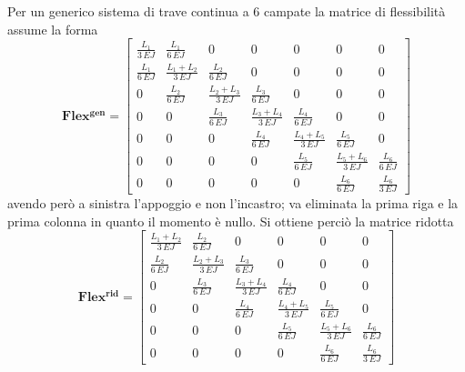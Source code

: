 Per un generico sistema di trave continua a $6$ campate la matrice di flessibilità assume la forma
\begin{equation}
\mathbf{Flex^{gen}}=
\begin{bmatrix}
\frac{L_{1}}{3 \, \mathit{EJ}} & \frac{L_{1}}{6 \, \mathit{EJ}} & 0 & 0 & 0 & 0 & 0 \\
\frac{L_{1}}{6 \, \mathit{EJ}} & \frac{L_{1} + L_{2}}{3 \, \mathit{EJ}} & \frac{L_{2}}{6 \, \mathit{EJ}} & 0 & 0 & 0 & 0 \\
0 & \frac{L_{2}}{6 \, \mathit{EJ}} & \frac{L_{2} + L_{3}}{3 \, \mathit{EJ}} & \frac{L_{3}}{6 \, \mathit{EJ}} & 0 & 0 & 0 \\
0 & 0 & \frac{L_{3}}{6 \, \mathit{EJ}} & \frac{L_{3} + L_{4}}{3 \, \mathit{EJ}} & \frac{L_{4}}{6 \, \mathit{EJ}} & 0 & 0 \\
0 & 0 & 0 & \frac{L_{4}}{6 \, \mathit{EJ}} & \frac{L_{4} + L_{5}}{3 \, \mathit{EJ}} & \frac{L_{5}}{6 \, \mathit{EJ}} & 0 \\
0 & 0 & 0 & 0 & \frac{L_{5}}{6 \, \mathit{EJ}} & \frac{L_{5} + L_{6}}{3 \, \mathit{EJ}} & \frac{L_{6}}{6 \, \mathit{EJ}} \\
0 & 0 & 0 & 0 & 0 & \frac{L_{6}}{6 \, \mathit{EJ}} & \frac{L_{6}}{3 \, \mathit{EJ}}
\end{bmatrix}
\end{equation}
avendo però a sinistra l'appoggio e non l'incastro; va eliminata la prima riga e la prima colonna in quanto il momento è nullo.
Si ottiene perciò la matrice ridotta
\begin{equation}
\mathbf{Flex^{rid}}=
\begin{bmatrix}
\frac{L_{1} + L_{2}}{3 \, \mathit{EJ}} & \frac{L_{2}}{6 \, \mathit{EJ}} & 0 & 0 & 0 & 0 \\
\frac{L_{2}}{6 \, \mathit{EJ}} & \frac{L_{2} + L_{3}}{3 \, \mathit{EJ}} & \frac{L_{3}}{6 \, \mathit{EJ}} & 0 & 0 & 0 \\
0 & \frac{L_{3}}{6 \, \mathit{EJ}} & \frac{L_{3} + L_{4}}{3 \, \mathit{EJ}} & \frac{L_{4}}{6 \, \mathit{EJ}} & 0 & 0 \\
0 & 0 & \frac{L_{4}}{6 \, \mathit{EJ}} & \frac{L_{4} + L_{5}}{3 \, \mathit{EJ}} & \frac{L_{5}}{6 \, \mathit{EJ}} & 0 \\
0 & 0 & 0 & \frac{L_{5}}{6 \, \mathit{EJ}} & \frac{L_{5} + L_{6}}{3 \, \mathit{EJ}} & \frac{L_{6}}{6 \, \mathit{EJ}} \\
0 & 0 & 0 & 0 & \frac{L_{6}}{6 \, \mathit{EJ}} & \frac{L_{6}}{3 \, \mathit{EJ}}
\end{bmatrix}
\end{equation}
